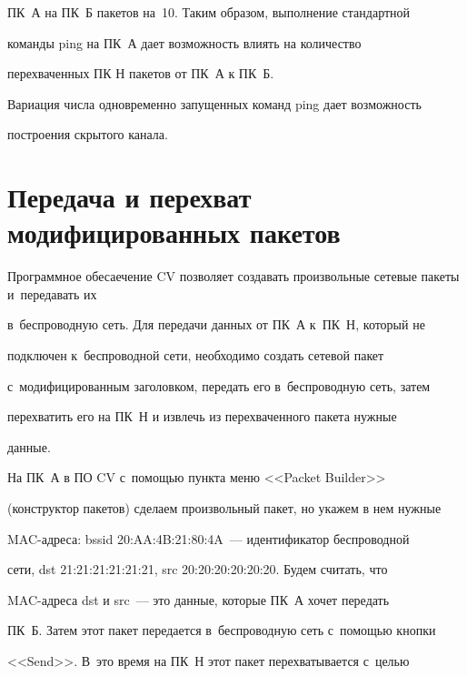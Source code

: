 ПК~А на ПК~Б пакетов на~10. Таким образом, выполнение стандартной


команды ping на ПК~А дает возможность влиять на количество


перехваченных ПК Н пакетов от ПК~А к ПК~Б.





   Вариация числа одновременно запущенных команд ping дает возможность


построения скрытого канала.











\section{Передача и перехват модифицированных пакетов}








  Программное обесаечение CV позволяет создавать произвольные сетевые пакеты и~передавать их


в~беспроводную сеть. Для передачи данных от ПК~А к~ПК~Н, который не


подключен к~беспроводной сети, необходимо создать сетевой пакет


с~модифицированным заголовком, передать его в~беспроводную сеть, затем


перехватить его на ПК~Н и извлечь из перехваченного пакета нужные


данные.





  На ПК~А в ПО CV с~помощью пункта меню <<Packet Builder>>


(конструктор пакетов) сделаем произвольный пакет, но укажем в нем нужные


MAC-ад\-ре\-са: bssid 20:AA:4B:21:80:4A~--- идентификатор беспроводной


сети, dst 21:21:21:21:21:21, src 20:20:20:20:20:20. Будем считать, что


  MAC-ад\-ре\-са dst и src~--- это данные, которые ПК~А хочет передать


ПК~Б. Затем этот пакет передается в~беспроводную сеть с~помощью кнопки


<<Send>>. В~это время на ПК~Н этот пакет перехватывается с~целью


